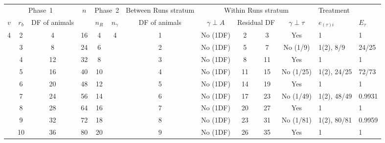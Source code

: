 \documentclass[a4paper,11pt]{article}
\begin{document}
\begin{landscape}
\begin{tabular}[t]{|c|c|c|c|c|c|c|c|c|c|c|p{1in}|p{0.4in}|} \hline
\multicolumn{3}{|c|}{Phase~1}  & $n$  & \multicolumn{2}{c|}{Phase~2} & Between Runs stratum  & \multicolumn{4}{c|}{Within Runs stratum} & \multicolumn{2}{p{1.4in}|}{Treatment} \\ \cline{1-3} \cline{5-6}\cline{7-13}
$v$ & $r_b$ & DF of animals &  & $n_R$ & $n_\gamma$ & DF of animals &  $\gamma \perp A$ & \multicolumn{2}{c|}{Residual DF} & $\gamma \perp \tau$ & $e_{(\tau)i}$ &$E_\tau$\\ \hline
4 & 2 & 4 & 16 & 4 & 4 & 1 & No (1DF) & 2 & 3 & Yes & 1 & 1 \\ \hline 
 & 3 & 8 & 24 & 6 &  & 2 & No (1DF) & 5 & 7 & No (1/9) & 1(2), 8/9 & 24/25 \\ \hline 
 & 4 & 12 & 32 & 8 &  & 3 & No (1DF) & 8 & 11 & Yes & 1 & 1 \\ \hline 
 & 5 & 16 & 40 & 10 &  & 4 & No (1DF) & 11 & 15 & No (1/25) & 1(2), 24/25 & 72/73 \\ \hline 
 & 6 & 20 & 48 & 12 &  & 5 & No (1DF) & 14 & 19 & Yes & 1 & 1 \\ \hline 
 & 7 & 24 & 56 & 14 &  & 6 & No (1DF) & 17 & 23 & No (1/49) & 1(2), 48/49 & 0.9931 \\ \hline 
 & 8 & 28 & 64 & 16 &  & 7 & No (1DF) & 20 & 27 & Yes & 1 & 1 \\ \hline 
 & 9 & 32 & 72 & 18 &  & 8 & No (1DF) & 23 & 31 & No (1/81) & 1(2), 80/81 & 0.9959 \\ \hline 
 & 10 & 36 & 80 & 20 &  & 9 & No (1DF) & 26 & 35 & Yes & 1 & 1 \\ \hline 
\end{tabular}



\end{landscape}
\end{document}
